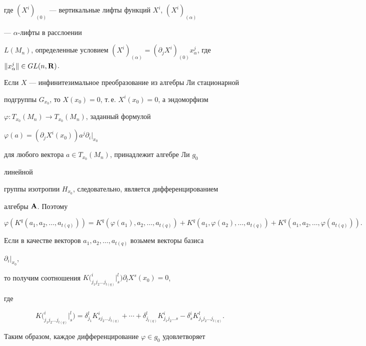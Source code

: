 где $(X^i)_{(0)}$ --- вертикальные лифты функций $X^i$, $(X^i)_{(\alpha)}$ 


--- $\alpha$-лифты в расслоении 


$L(M_n)$, определенные условием $(X^i)_{(\alpha)}=(\partial_j 


X^i)_{(0)}x^j_\alpha$, где $\|x^j_\alpha\|\in GL(n,\bold R)$. 


 


Если $X$ --- инфинитезимальное преобразование из алгебры Ли стационарной  


подгруппы $G_{x_0}$, то $X(x_0)=0$, т.\,е. $X^i(x_0)=0$, а эндоморфизм  


$\varphi:T_{x_0}(M_n)\to T_{x_0}(M_n)$, заданный формулой 


$\varphi(a)=(\partial_j X^i(x_0))a^j\partial_i|_{x_0}$ 


для любого вектора $a\in T_{x_0}(M_n)$, принадлежит алгебре Ли $g_0$ 


линейной  


группы изотропии $H_{x_0}$, следовательно, является дифференцированием  


алгебры $\bold A$. Поэтому 


$$ 


\varphi(K^q(a_1,a_2,\dotsc,a_{t(q)}))=K^q 


(\varphi(a_1),a_2,\dotsc,a_{t(q)})+K^q(a_1, 


\varphi(a_2),\dotsc,a_{t(q)})+K^q(a_1,a_2,\dotsc,\varphi(a_{t(q)})). 


$$ 


Если в качестве векторов $a_1,a_2,\dotsc,a_{t(q)}$ возьмем векторы базиса 


$\partial_i|_{x_0}$, 


то получим соотношения $K\big(^i_{j_1j_2\dotsc j_{t(q)}} \big|^l_s 


\big)\partial_l X^s(x_0)=0$, 


где  


$$ 


K\big(^i_{j_1j_2\dotsc j_{t(q)}} \big|^l_s \big)= 


\delta^l_{j_1}K^i_{s j_2\dotsc j_{t(q)}}+\dotsb+ 


\delta^l_{j_{t(q)}}K^i_{j_1j_2\dotsc s}- 


\delta^i_s K^l_{j_1j_2\dotsc j_{t(q)}}.


$$ 


 


Таким образом, каждое дифференцирование $\varphi\in g_0$ удовлетворяет  


